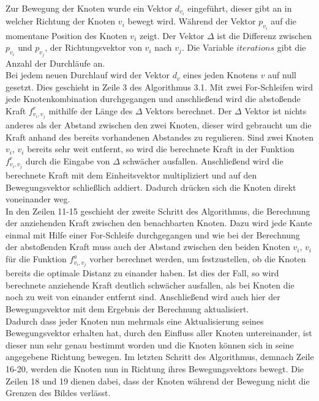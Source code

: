 
Zur Bewegung der Knoten wurde ein Vektor $d_{v_{i}}$ eingeführt, dieser gibt an in welcher Richtung der Knoten $v_{i}$ bewegt wird. Während der Vektor $p_{v_{i}}$ auf die momentane Position des Knoten $v_{i}$ zeigt. Der Vektor $\Delta$ ist die Differenz zwischen $p_{v_{i}}$ und $p_{v_{j}}$, der Richtungsvektor von $v_{i}$ nach $v_{j}$. Die Variable $iterations$ gibt die Anzahl der Durchläufe an. \\

Bei jedem neuen Durchlauf wird der Vektor  $d_{v}$  eines jeden Knotens $v$ auf null gesetzt. Dies geschieht in Zeile 3 des Algorithmus 3.1. Mit zwei For-Schleifen wird jede Knotenkombination durchgegangen und anschließend wird die abstoßende Kraft $f^{r}_{v_{i},v_{j}}$ mithilfe der Länge des $\Delta$ Vektors berechnet. Der $\Delta$ Vektor ist nichts anderes als der Abstand zwischen den zwei Knoten, dieser wird gebraucht um die Kraft anhand des bereits vorhandenen Abstandes zu regulieren. Sind zwei Knoten $v_{i}$, $v_{i}$ bereits sehr weit entfernt, so wird die berechnete Kraft in der Funktion $f^{r}_{v_{i},v_{j}}$ durch die Eingabe von $\Delta$ schwächer ausfallen. Anschließend wird die berechnete Kraft mit dem Einheitsvektor multipliziert und auf den Bewegungsvektor schließlich addiert. Dadurch drücken sich die Knoten direkt voneinander weg. \\

In den Zeilen 11-15 geschieht der zweite Schritt des Algorithmus, die Berechnung der anziehenden Kraft zwischen den benachbarten Knoten. Dazu wird jede Kante einmal mit Hilfe einer For-Schleife durchgegangen und wie bei der Berechnung der abstoßenden Kraft muss auch der Abstand zwischen den beiden Knoten $v_{i}$, $v_{i}$ für die Funktion $f^{a}_{v_{i},v_{j}}$ vorher berechnet werden, um festzustellen, ob die Knoten bereits die optimale Distanz zu einander haben. Ist dies der Fall, so wird berechnete anziehende Kraft deutlich schwächer ausfallen, als bei Knoten die noch zu weit von einander entfernt sind. Anschließend wird auch hier der Bewegungsvektor mit dem Ergebnis der Berechnung aktualisiert. \\

Dadurch dass jeder Knoten nun mehrmals eine Aktualisierung seines Bewegungsvektor erhalten hat, durch den Einfluss aller Knoten untereinander, ist dieser nun sehr genau bestimmt worden und die Knoten können sich in seine angegebene Richtung bewegen. Im letzten Schritt des Algorithmus, demnach Zeile 16-20, werden die Knoten nun in Richtung ihres Bewegungsvektors bewegt. Die Zeilen 18 und 19 dienen dabei, dass der Knoten während der Bewegung nicht die Grenzen des Bildes verlässt. \\


